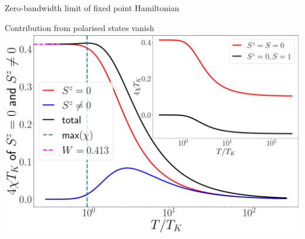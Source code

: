 \documentclass[aspectratio=169]{beamer}
\begin{document}
\begin{frame}[noframenumbering]{Zero-bandwidth limit of fixed point Hamiltonian}
{\begin{minipage}{0.57\textwidth}
{		Contribution from polarised states vanish
		\includegraphics[width=1.05\textwidth]{figures/chi_parts.pdf}
		\vspace*{-40pt}
}
	\end{minipage}
}

\end{frame}
\end{document}
